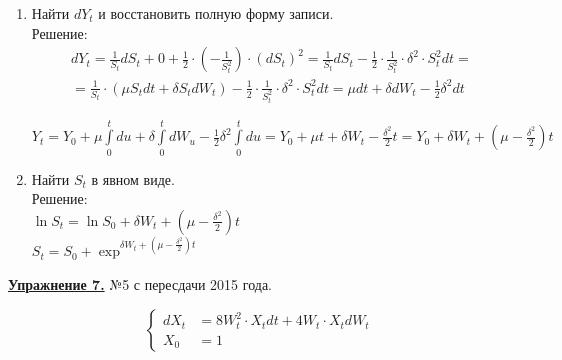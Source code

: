\documentclass[a4paper]{article}
\begin{document}
\begin{enumerate}[label={\alph*)}]
\item Найти $dY_t$ и восстановить полную форму записи.\\

Решение:
\begin{multline*}
dY_t=\frac{1}{S_t}dS_t+0+\frac{1}{2}\cdot \left(-\frac{1}{S^{2}_{t}}\right)\cdot (dS_t)^2=\frac{1}{S_t}dS_t-\frac{1}{2}\cdot \frac{1}{S^{2}_{t}}\cdot \delta^2\cdot S^{2}_{t}dt=\\
=\frac{1}{S_t}\cdot(\mu S_tdt+\delta S_tdW_t)-\frac{1}{2}\cdot \frac{1}{S^{2}_{t}}\cdot \delta^2\cdot S^{2}_{t}dt=\mu dt+\delta dW_t-\frac{1}{2}\delta^2dt
\end{multline*}

$Y_t=Y_0+\mu \int\limits_{0}^{t}du+\delta \int\limits_{0}^{t}dW_u-\frac{1}{2}\delta^2\int\limits_{0}^{t}du=Y_0+\mu t+\delta W_t-\frac{\delta^2}{2}t=Y_0+\delta W_t+\left(\mu-\frac{\delta^2}{2}\right)t$\\

\item Найти $S_t$ в явном виде.\\

Решение:\\

$\ln S_t=\ln S_0+\delta W_t+\left(\mu-\frac{\delta^2}{2}\right)t$\\

$S_t=S_0+\exp^{\delta W_t+\left(\mu-\frac{\delta^2}{2}\right)t}$

\end{enumerate}

\par {\bf\underline{Упражнение 7.}} №5 с пересдачи 2015 года.

\begin{equation*}
	\left\{
		\begin{aligned}
dX_t &= 8W^{2}_{t}\cdot X_tdt+4W_t\cdot X_tdW_t\\
X_0  &= 1
		\end{aligned}
	\right.
\end{equation*}
\end{document}
